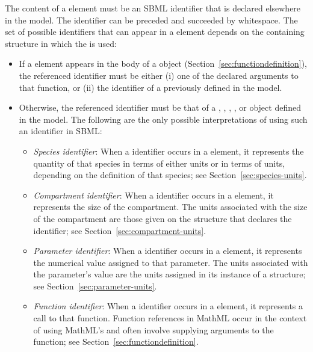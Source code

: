 The content of a  element must be an SBML identifier
that is declared elsewhere in the model.  The identifier can be
preceded and succeeded by whitespace. The set of possible
identifiers that can appear in a  element depends on the
containing structure in which the  is used:
\begin{itemize}
  
\item If a  element appears in the body of a
  \FunctionDefinition object
  (Section~\ref{sec:functiondefinition}), the referenced
  identifier must be either (i) one of the declared arguments to
  that function, or (ii) the identifier of a previously defined
   in the model.
  
\item Otherwise, the referenced identifier must be that of a
  \Species, \Compartment, \Parameter, \FunctionDefinition, or
  \Reaction object defined in the model.  The following are the
  only possible interpretations of using such an identifier in
  SBML:
  \begin{itemize}
    
  \item \emph{Species identifier}: When a \Species identifier
    occurs in a  element, it represents the quantity of
    that species in terms of either 
    units or in terms of  units, depending
    on the definition of that species; see
    Section~\ref{sec:species-units}.
    
  \item \emph{Compartment identifier}: When a \Compartment
    identifier occurs in a  element, it represents the
    size of the compartment.  The units associated with the size
    of the compartment are those given on the \Compartment
    structure that declares the identifier; see
    Section~\ref{sec:compartment-units}.
    
  \item \emph{Parameter identifier}: When a \Parameter identifier
    occurs in a  element, it represents the numerical
    value assigned to that parameter.  The units associated with
    the parameter's value are the units assigned in its instance
    of a \Parameter structure; see
    Section~\ref{sec:parameter-units}.
    
  \item \emph{Function identifier}: When a \FunctionDefinition
    identifier occurs in a  element, it represents a
    call to that function.  Function references in MathML occur in
    the context of using MathML's  and often involve
    supplying arguments to the function; see
    Section~\ref{sec:functiondefinition}.
    

\end{itemize}
\end{itemize}
